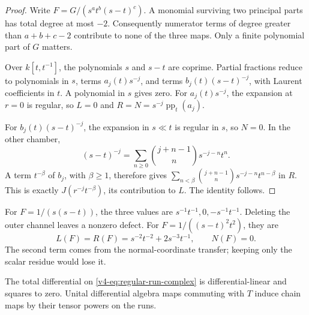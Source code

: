 \begin{proof}
Write \(F=G/(s^at^b(s-t)^c)\). A monomial surviving two
principal parts has total degree at most \(-2\).
Consequently numerator terms of degree greater than
\(a+b+c-2\) contribute to none of the three maps.
Only a finite polynomial part of \(G\) matters.

Over \(k[t,t^{-1}]\), the polynomials \(s\) and \(s-t\)
are coprime. Partial fractions reduce to polynomials in
\(s\), terms \(a_j(t)s^{-j}\), and terms
\(b_j(t)(s-t)^{-j}\), with Laurent coefficients in \(t\).
A polynomial in \(s\) gives zero. For \(a_j(t)s^{-j}\),
the expansion at \(r=0\) is regular, so \(L=0\) and
\(R=N=s^{-j}\operatorname{pp}_t(a_j)\).

For \(b_j(t)(s-t)^{-j}\), the expansion in \(s\ll t\)
is regular in \(s\), so \(N=0\). In the other chamber,
\[
 (s-t)^{-j}
       =\sum_{n\geq0}\binom{j+n-1}{n}s^{-j-n}t^n.
\]
A term \(t^{-\beta}\) of \(b_j\), with \(\beta\geq1\),
therefore gives
\(\sum_{n<\beta}\binom{j+n-1}{n}s^{-j-n}t^{n-\beta}\)
in \(R\). This is exactly \(J(r^{-j}t^{-\beta})\),
its contribution to \(L\). The identity follows.
\end{proof}

For \(F=1/(s(s-t))\), the three values are
\(s^{-1}t^{-1},0,-s^{-1}t^{-1}\).
Deleting the outer channel leaves a nonzero defect.
For \(F=1/((s-t)^2t^2)\), they are
\[
 L(F)=R(F)=s^{-2}t^{-2}+2s^{-3}t^{-1},
 \qquad N(F)=0.
\]
The second term comes from the normal-coordinate transfer;
keeping only the scalar residue would lose it.

\begin{theorem}
\label{v4-thm:regular-residue-complex}
The total differential on
\eqref{v4-eq:regular-run-complex} is differential-linear
and squares to zero. Unital differential algebra maps
commuting with \(T\) induce chain maps by their tensor
powers on the runs.
\end{theorem}

